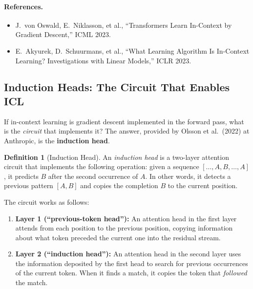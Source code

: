 \documentclass[11pt, a4paper]{article}
\theoremstyle{definition}
\newtheorem{definition}{Definition}[section]
\theoremstyle{plain}
\begin{document}
\paragraph{References.}
\begin{itemize}[leftmargin=2em, itemsep=2pt]
  \item J.\ von Oswald, E.\ Niklasson, et al., ``Transformers Learn
    In-Context by Gradient Descent,'' ICML 2023.
  \item E.\ Akyurek, D.\ Schuurmans, et al., ``What Learning Algorithm
    Is In-Context Learning? Investigations with Linear Models,'' ICLR 2023.
\end{itemize}

\subsection{Induction Heads: The Circuit That Enables ICL}
\label{sec:induction}

If in-context learning is gradient descent implemented in the forward
pass, what is the \emph{circuit} that implements it?  The answer, provided
by Olsson et al.\ (2022) at Anthropic, is the \textbf{induction head}.

\begin{definition}[Induction Head]
An \emph{induction head} is a two-layer attention circuit that implements
the following operation: given a sequence $[\ldots, A, B, \ldots, A]$,
it predicts $B$ after the second occurrence of $A$.  In other words, it
detects a previous pattern $[A, B]$ and copies the completion $B$ to the
current position.
\end{definition}

The circuit works as follows:
\begin{enumerate}[leftmargin=2em]
  \item \textbf{Layer 1 (``previous-token head''):} An attention head in
    the first layer attends from each position to the previous position,
    copying information about what token preceded the current one into
    the residual stream.
  \item \textbf{Layer 2 (``induction head''):} An attention head in the
    second layer uses the information deposited by the first head to
    search for previous occurrences of the current token.  When it finds
    a match, it copies the token that \emph{followed} the match.
\end{enumerate}
\end{document}
